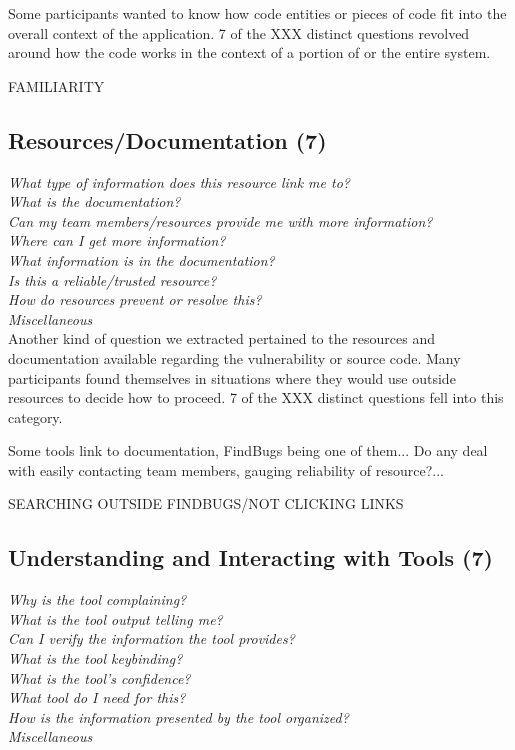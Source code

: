 \documentclass[conference]{IEEEtran}
\begin{document}
Some participants wanted to know how code entities or pieces of code fit into the overall context of the application. 7 of the XXX distinct questions revolved around how the code works in the context of a portion of or the entire system.

FAMILIARITY


\noindent\subsection{\textbf{Resources/Documentation (7)}}

\noindent\emph{What type of information does this resource link me to?} \\
\emph{What is the documentation?} \\
\emph{Can my team members/resources provide me with more information?} \\
\emph{Where can I get more information?} \\
\emph{What information is in the documentation?} \\
\emph{Is this a reliable/trusted resource?} \\
\emph{How do resources prevent or resolve this?} \\
\emph{Miscellaneous} \\

Another kind of question we extracted pertained to the resources and documentation available regarding the vulnerability or source code. Many participants found themselves in situations where they would use outside resources to decide how to proceed. 7 of the XXX distinct questions fell into this category. 

Some tools link to documentation, FindBugs being one of them...
Do any deal with easily contacting team members, gauging reliability of resource?...

SEARCHING OUTSIDE FINDBUGS/NOT CLICKING LINKS


\noindent\subsection{\textbf{Understanding and Interacting with Tools (7)}}

\noindent\emph{Why is the tool complaining?} \\
\emph{What is the tool output telling me?} \\
\emph{Can I verify the information the tool provides?} \\
\emph{What is the tool keybinding?} \\
\emph{What is the tool's confidence?} \\
\emph{What tool do I need for this?} \\
\emph{How is the information presented by the tool organized?} \\
\emph{Miscellaneous} \\
\end{document}
